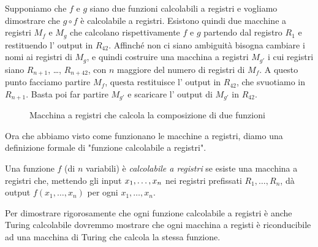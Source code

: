 \begin{esempio}[Composizione]

    Supponiamo che $ f $ e $ g $ siano due funzioni calcolabili a
    registri e vogliamo dimostrare che $ g\circ f $ \`e calcolabile a
    registri. Esistono quindi due macchine a registri \( M_f \) e \(
M_g \) che calcolano rispettivamente \( f \) e \( g \) partendo
    dal registro \( R_1 \) e restituendo l' output in \( R_42
\). Af\mbox{}f\mbox{}inch\'e non ci siano ambiguit\`a bisogna
    cambiare i nomi ai registri di \( M_g \), e quindi costruire una
    macchina a registri \( M_{g'} \) i cui re\-gi\-stri siano \(
R_{n+1} \), \ldots, \( R_{n+42} \), con \( n \) maggiore del
    numero di registri di \( M_f \). A questo punto facciamo partire
    \( M_f \), questa restituisce l' output in \( R_{42} \), che
    svuotiamo in \( R_{n+1} \). Basta poi far partire \( M_{g'} \) e
    scaricare l' output di \( M_{g'} \) in \( R_{42} \).


    \begin{figure}[hbpt]
    \hspace{0cm} 
     \caption{Macchina a registri che calcola la composizione di due funzioni}
    \end{figure}
\end{esempio}

Ora che abbiamo visto come funzionano le macchine a registri, diamo
una definizione formale di "funzione calcolabile a re\-gi\-stri".

\begin{defi}
Una funzione \( f \) (di \( n \) variabili) \`e \emph{calcolabile a registri}
se esiste una macchina a registri che, mettendo gli input \( x_1,
\ldots,\\ x_n \) nei registri pref\mbox{}issati \( R_1, \ldots, R_n
\), d\`a output \( f(x_1, \ldots, x_n) \) per ogni \( x_1, \ldots, x_n
\).
\end{defi}

Per dimostrare rigorosamente che ogni funzione calcolabile a registri \`e anche Turing calcolabile dovremmo mostrare che ogni macchina a registi \`e riconducibile ad una macchina di Turing che calcola la stessa funzione.

